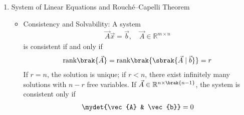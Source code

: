 \begin{enumerate}[label=\thesubsection.\arabic*, ref=\thesubsection.\theenumi,itemsep=0pt]
\begin{itemize}
\item Line Intersection and Solvability:
The lines $\vec{x} = \vec{A} + \kappa_1 \vec{m}_1$ and $\vec{x} = \vec{B} + \kappa_2 \vec{m}_2$ meet where:
\begin{align}
\myvec{\vec{m}_1 & -\vec{m}_2} \myvec{\kappa_1 \\ \kappa_2} = \vec{B} - \vec{A}
\label{eq:lineint} %
\end{align}
This system has a unique solution if and only if $\mydet{\vec{m}_1 & \vec{m}_2} \ne 0$. If the determinant is zero, the lines are parallel or coincident.

\item Angle Between Vectors:
The angle $\theta$ between two vectors $\vec{a}$ and $\vec{b}$ is given by:
\begin{align}
\cos\theta = \frac{\vec{a}^\top \vec{b}}{\norm{\vec{a}}\norm{\vec{b}}}
\label{eq:angle} %
\end{align}
Two vectors are orthogonal if and only if $\vec{a}^\top \vec{b} = 0$.

\item Circle Representation and Chords:
A point on a circle of radius $r$ centered at the origin is $\vec{x} = r \myvec{\cos\alpha \\ \sin\alpha}$ with $\vec{e}_\alpha \triangleq \myvec{\cos\alpha \\ \sin\alpha}$. The chord length between $\vec{x}_\alpha = r\vec{e}_\alpha$ and $\vec{x}_\beta = r\vec{e}_\beta$ satisfies:
\begin{align}
\vec{e}_\alpha^\top \vec{e}_\beta &= \cos\brak{\alpha - \beta} \label{eq:cosdiff} \\ %
\norm{\vec{x}_\alpha - \vec{x}_\beta}^2 &= 2r^2 \brak{1 - \vec{e}_\alpha^\top \vec{e}_\beta} = 4r^2 \sin^2 \frac{\alpha - \beta}{2}
\end{align}
\end{itemize}

\item System of Linear Equations and Rouch\'{e}--Capelli Theorem
\begin{itemize}
\item Consistency and Solvability:
A system
\begin{align} %
\vec{A}\vec{x} = \vec{b}, \quad \vec{A} \in \mathbb{R}^{m \times n}
\label{eq:axb} %
\end{align}
is consistent if and only if
\begin{align}
\text{rank}\brak{\vec{A}} = \text{rank}\brak{\sbrak{\vec{A} \mid \vec{b}}} = r
\label{eq:rc} %
\end{align}
If $r = n$, the solution is unique; if $r < n$, there exist infinitely many solutions with $n - r$ free variables. If $\vec{A} \in \mathbb{R}^{n \times \brak{n-1}}$, the system is consistent only if
\begin{align} %
\mydet{\vec{A} & \vec{b}} = 0
\label{eq:augdet} %
\end{align}


\end{itemize}
\end{enumerate}
